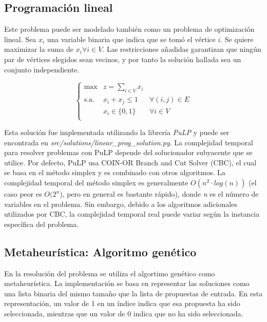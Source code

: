 \documentclass[10pt]{article} %
\begin{document}
	\subsection{Programaci\'on lineal}
	
	Este problema puede ser modelado tambi\'en como un problema de optimizaci\'on lineal. Sea $ x_{i} $ una variable binaria que indica que se tom\'o el v\'ertice $ i $. Se quiere maximizar la suma de $ x_i \forall i \in V $. Las restricciones a\~nadidas  garantizan que ning\'un par de v\'ertices elegidos sean vecinos, y por tanto la soluci\'on hallada sea un conjunto independiente. 
		
	\begin{equation} \left\{
		\begin{matrix}
			\max & \displaystyle z=\sum_{i \in V}x_{i}\\
			\textrm{s.a.} & x_i + x_j \leq 1 & \forall (i, j) \in E \\
			& x_i \in \{0, 1\} & \forall i \in V \\ 
		\end{matrix} \right. 
	\end{equation} 
	
	Esta soluci\'on fue implementada utilizando la librer\'ia \textit{PuLP} y puede ser encontrada en \textit{src/solutions/linear\_prog\_solution.py}. La complejidad temporal para resolver problemas con PuLP depende del solucionador subyacente que se utilice. Por defecto, PuLP usa COIN-OR Branch and Cut Solver (CBC), el cual se basa en el método simplex y es combinado con otros algoritmos. La complejidad temporal del método simplex es generalmente $O(n^2 \cdot log(n))$ (el caso peor es $O(2^{n} $), pero en general es bastante r\'apido), donde \textit{n} es el número de variables en el problema. Sin embargo, debido a los algoritmos adicionales utilizados por CBC, la complejidad temporal real puede variar según la instancia específica del problema.
	
	
	\subsection{Metaheur\'istica: Algoritmo gen\'etico}
	
	En la resoluci\'on del problema se utiliza el algortimo gen\'etico como metaheur\'istica. La implementación se basa en representar las soluciones como una lista binaria del mismo tamaño que la lista de propuestas de entrada. En esta representación, un valor de 1 en un índice indica que esa propuesta ha sido seleccionada, mientras que un valor de 0 indica que no ha sido seleccionada.
	
\end{document}
